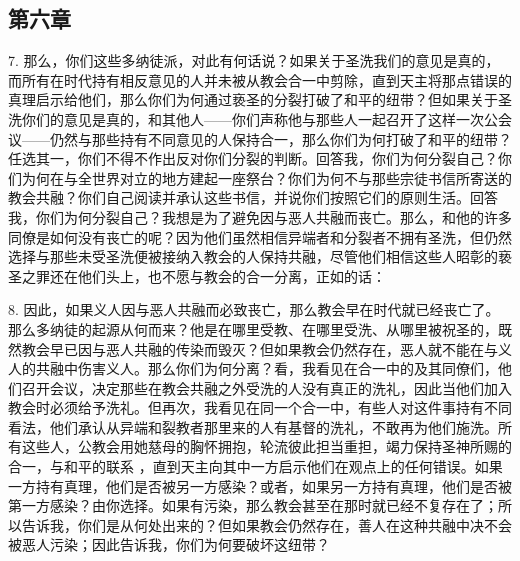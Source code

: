 \subsection{第六章}

7. 那么，你们这些多纳徒派，对此有何话说？如果关于圣洗我们的意见是真的，而所有在时代持有相反意见的人并未被从教会合一中剪除，直到天主将那点错误的真理启示给他们，那么你们为何通过亵圣的分裂打破了和平的纽带？但如果关于圣洗你们的意见是真的，和其他人——你们声称他与那些人一起召开了这样一次公会议——仍然与那些持有不同意见的人保持合一，那么你们为何打破了和平的纽带？任选其一，你们不得不作出反对你们分裂的判断。回答我，你们为何分裂自己？你们为何在与全世界对立的地方建起一座祭台？你们为何不与那些宗徒书信所寄送的教会共融？你们自己阅读并承认这些书信，并说你们按照它们的原则生活。回答我，你们为何分裂自己？我想是为了避免因与恶人共融而丧亡。那么，和他的许多同僚是如何没有丧亡的呢？因为他们虽然相信异端者和分裂者不拥有圣洗，但仍然选择与那些未受圣洗便被接纳入教会的人保持共融，尽管他们相信这些人昭彰的亵圣之罪还在他们头上，也不愿与教会的合一分离，正如的话：\par

8. 因此，如果义人因与恶人共融而必致丧亡，那么教会早在时代就已经丧亡了。那么多纳徒的起源从何而来？他是在哪里受教、在哪里受洗、从哪里被祝圣的，既然教会早已因与恶人共融的传染而毁灭？但如果教会仍然存在，恶人就不能在与义人的共融中伤害义人。那么你们为何分离？看，我看见在合一中的及其同僚们，他们召开会议，决定那些在教会共融之外受洗的人没有真正的洗礼，因此当他们加入教会时必须给予洗礼。但再次，我看见在同一个合一中，有些人对这件事持有不同看法，他们承认从异端和裂教者那里来的人有基督的洗礼，不敢再为他们施洗。所有这些人，公教会用她慈母的胸怀拥抱，轮流彼此担当重担，竭力保持圣神所赐的合一，与和平的联系 ，直到天主向其中一方启示他们在观点上的任何错误。如果一方持有真理，他们是否被另一方感染？或者，如果另一方持有真理，他们是否被第一方感染？由你选择。如果有污染，那么教会甚至在那时就已经不复存在了；所以告诉我，你们是从何处出来的？但如果教会仍然存在，善人在这种共融中决不会被恶人污染；因此告诉我，你们为何要破坏这纽带？\par

